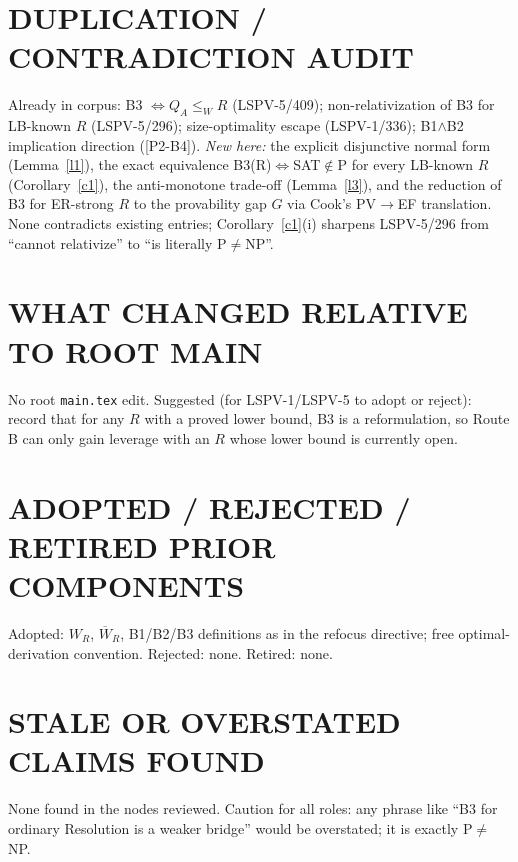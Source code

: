 \documentclass[11pt]{article}
\theoremstyle{definition}
\begin{document}
\section{DUPLICATION / CONTRADICTION AUDIT}
Already in corpus: B3 $\iff Q_A\le_W R$ (LSPV-5/409); non-relativization of B3 for
LB-known $R$ (LSPV-5/296); size-optimality escape (LSPV-1/336); B1$\wedge$B2 implication
direction ([P2-B4]). \emph{New here:} the explicit disjunctive normal form
(Lemma~\ref{l1}), the exact equivalence B3(R)$\iff$SAT$\notin$P for every LB-known $R$
(Corollary~\ref{c1}), the anti-monotone trade-off (Lemma~\ref{l3}), and the reduction of
B3 for ER-strong $R$ to the provability gap $G$ via Cook's PV$\to$EF translation.
None contradicts existing entries; Corollary~\ref{c1}(i) sharpens LSPV-5/296 from
``cannot relativize'' to ``is literally P$\ne$NP''.

\section{WHAT CHANGED RELATIVE TO ROOT MAIN}
No root \texttt{main.tex} edit. Suggested (for LSPV-1/LSPV-5 to adopt or reject):
record that for any $R$ with a proved lower bound, B3 is a reformulation, so Route B
can only gain leverage with an $R$ whose lower bound is currently open.

\section{ADOPTED / REJECTED / RETIRED PRIOR COMPONENTS}
Adopted: $W_R$, $\overline W_R$, B1/B2/B3 definitions as in the refocus directive;
free optimal-derivation convention. Rejected: none. Retired: none.

\section{STALE OR OVERSTATED CLAIMS FOUND}
None found in the nodes reviewed. Caution for all roles: any phrase like
``B3 for ordinary Resolution is a weaker bridge'' would be overstated; it is exactly P$\ne$NP.
\end{document}
